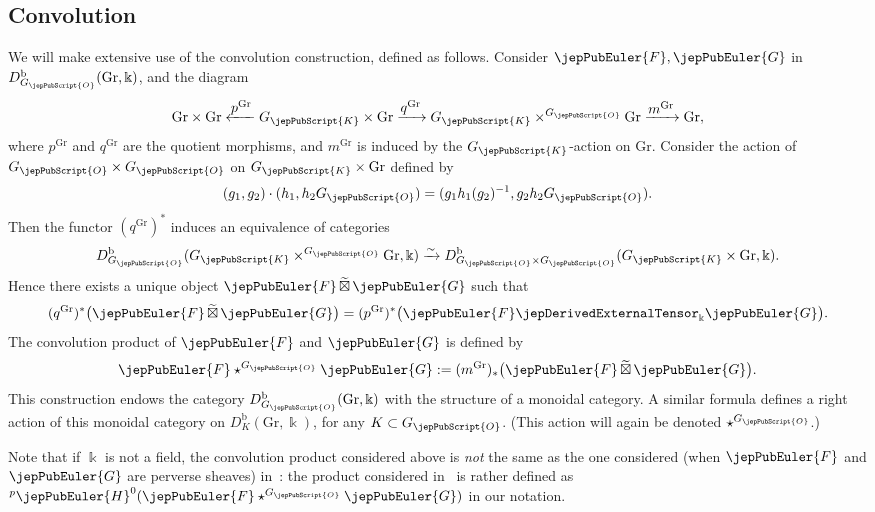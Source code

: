 \subsection{Convolution}
\label{jep104local033}

We will make extensive use of the convolution construction, defined as follows. Consider $\jepPubEuler{F},\jepPubEuler{G}$ in $D^{\mathrm{b}}_{G_{\jepPubScript{O}}}(\mathrm{Gr},\Bbbk)$, and the diagram
\[
 \mathrm{Gr} \times \mathrm{Gr} \xleftarrow{\textstyle p^\mathrm{Gr}} G_{\jepPubScript{K}} \times \mathrm{Gr} \xrightarrow{\textstyle q^\mathrm{Gr}} G_{\jepPubScript{K}} \times^{G_{\jepPubScript{O}}} \mathrm{Gr} \xrightarrow{\textstyle m^\mathrm{Gr}} \mathrm{Gr},
\]
where $p^\mathrm{Gr}$ and $q^\mathrm{Gr}$ are the quotient morphisms, and $m^\mathrm{Gr}$ is induced by the $G_{\jepPubScript{K}}$-action on $\mathrm{Gr}$. Consider the action of $G_{\jepPubScript{O}} \times G_{\jepPubScript{O}}$ on $G_{\jepPubScript{K}} \times \mathrm{Gr}$ defined by
\[
 (g_1,g_2) \cdot (h_1,h_2G_{\jepPubScript{O}}) = (g_1h_1(g_2)^{-1}, g_2 h_2G_{\jepPubScript{O}}).
\]
Then the functor $(q^\mathrm{Gr})^*$ induces an equivalence of categories
\[
 D^{\mathrm{b}}_{G_{\jepPubScript{O}}}(G_{\jepPubScript{K}} \times^{G_{\jepPubScript{O}}} \mathrm{Gr},\Bbbk) \xrightarrow{\sim} D^{\mathrm{b}}_{G_{\jepPubScript{O}} \times G_{\jepPubScript{O}}}(G_{\jepPubScript{K}} \times \mathrm{Gr},\Bbbk).
\]
Hence there exists a unique object $\jepPubEuler{F} \, \widetilde{\boxtimes} \, \jepPubEuler{G}$ such that
\[
 (q^\mathrm{Gr})^* \bigl( \jepPubEuler{F} \, \widetilde{\boxtimes} \, \jepPubEuler{G} \bigr) = (p^\mathrm{Gr})^* \bigl( \jepPubEuler{F} \jepDerivedExternalTensor_{\Bbbk} \jepPubEuler{G} \bigr).
\]
The convolution product of $\jepPubEuler{F}$ and $\jepPubEuler{G}$ is defined by
\begin{equation}
\label{jep104local008}
\jepPubEuler{F} \star^{G_{\jepPubScript{O}}} \jepPubEuler{G} := (m^\mathrm{Gr})_* \bigl( \jepPubEuler{F} \, \widetilde{\boxtimes} \, \jepPubEuler{G} \bigr).
\end{equation}
This construction endows the category $D^{\mathrm{b}}_{G_{\jepPubScript{O}}}(\mathrm{Gr},\Bbbk)$ with the structure of a monoidal category. A similar formula defines a right action of this monoidal category on $D^{\mathrm{b}}_K(\mathrm{Gr},\Bbbk)$, for any $K \subset G_{\jepPubScript{O}}$. (This action will again be denoted $\star^{G_{\jepPubScript{O}}}$.)

\begin{rmk}
 Note that if $\Bbbk$ is not a field, the convolution product considered above is \emph{not} the same as the one considered (when $\jepPubEuler{F}$ and $\jepPubEuler{G}$ are perverse sheaves) in~\cite{jep104ref36}: the product considered in~\cite{jep104ref36} is rather defined as ${}^{p}\jepPubEuler{H}^0(\jepPubEuler{F} \star^{G_{\jepPubScript{O}}} \jepPubEuler{G})$ in our notation.
\end{rmk}

